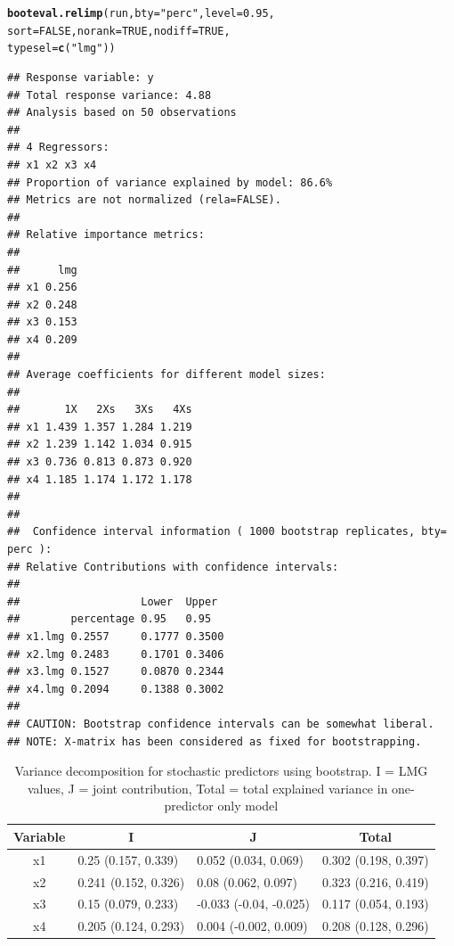 \documentclass[11pt,a4paper,twoside]{book}
\makeatletter
\newcommand{\hlnum}[1]{\textcolor[rgb]{0.686,0.059,0.569}{#1}}%
\newcommand{\hlstr}[1]{\textcolor[rgb]{0.192,0.494,0.8}{#1}}%
\newcommand{\hlstd}[1]{\textcolor[rgb]{0.345,0.345,0.345}{#1}}%
\newcommand{\hlkwc}[1]{\textcolor[rgb]{0.333,0.667,0.333}{#1}}%
\newcommand{\hlkwd}[1]{\textcolor[rgb]{0.737,0.353,0.396}{\textbf{#1}}}%
\newenvironment{kframe}{%
 \def\at@end@of@kframe{}%
 \ifinner\ifhmode%
  \def\at@end@of@kframe{\end{minipage}}%
  \begin{minipage}{\columnwidth}%
 \fi\fi%
 \def\FrameCommand##1{\hskip\@totalleftmargin \hskip-\fboxsep
 \colorbox{shadecolor}{##1}\hskip-\fboxsep
     \hskip-\linewidth \hskip-\@totalleftmargin \hskip\columnwidth}%
 \MakeFramed {\advance\hsize-\width
   \@totalleftmargin\z@ \linewidth\hsize
   \@setminipage}}%
 {\par\unskip\endMakeFramed%
 \at@end@of@kframe}
\newenvironment{knitrout}{}{} %
\makeatother
\begin{document}
\begin{knitrout}
\begin{kframe}
\begin{alltt}
\hlkwd{booteval.relimp}\hlstd{(run,} \hlkwc{bty} \hlstd{=} \hlstr{"perc"}\hlstd{,} \hlkwc{level} \hlstd{=} \hlnum{0.95}\hlstd{,}
                \hlkwc{sort} \hlstd{=} \hlnum{FALSE}\hlstd{,} \hlkwc{norank} \hlstd{=} \hlnum{TRUE}\hlstd{,} \hlkwc{nodiff} \hlstd{=} \hlnum{TRUE}\hlstd{,}
                \hlkwc{typesel} \hlstd{=} \hlkwd{c}\hlstd{(}\hlstr{"lmg"}\hlstd{))}
\end{alltt}
\begin{verbatim}
## Response variable: y 
## Total response variance: 4.88 
## Analysis based on 50 observations 
## 
## 4 Regressors: 
## x1 x2 x3 x4 
## Proportion of variance explained by model: 86.6%
## Metrics are not normalized (rela=FALSE). 
## 
## Relative importance metrics: 
## 
##      lmg
## x1 0.256
## x2 0.248
## x3 0.153
## x4 0.209
## 
## Average coefficients for different model sizes: 
## 
##       1X   2Xs   3Xs   4Xs
## x1 1.439 1.357 1.284 1.219
## x2 1.239 1.142 1.034 0.915
## x3 0.736 0.813 0.873 0.920
## x4 1.185 1.174 1.172 1.178
## 
##  
##  Confidence interval information ( 1000 bootstrap replicates, bty= perc ): 
## Relative Contributions with confidence intervals: 
##  
##                   Lower  Upper
##        percentage 0.95   0.95  
## x1.lmg 0.2557     0.1777 0.3500
## x2.lmg 0.2483     0.1701 0.3406
## x3.lmg 0.1527     0.0870 0.2344
## x4.lmg 0.2094     0.1388 0.3002
## 
## CAUTION: Bootstrap confidence intervals can be somewhat liberal. 
## NOTE: X-matrix has been considered as fixed for bootstrapping.
\end{verbatim}
\end{kframe}
\end{knitrout}

\begin{table}[h]
\centering
\begin{tabular}{clll}
  \hline
  \multicolumn{1}{c}{\textbf{Variable}} & \multicolumn{1}{c}{\textbf{I}} &\multicolumn{1}{c}{\textbf{J}} & \multicolumn{1}{c}{\textbf{Total}} \\
  \hline
x1 & 0.25 (0.157, 0.339)  & 0.052 (0.034, 0.069)   & 0.302 (0.198, 0.397)  \\ 
x2 & 0.241 (0.152, 0.326)  & 0.08 (0.062, 0.097)   & 0.323 (0.216, 0.419)  \\ 
x3 & 0.15 (0.079, 0.233)  & -0.033 (-0.04, -0.025)   & 0.117 (0.054, 0.193)  \\ 
x4 & 0.205 (0.124, 0.293)  & 0.004 (-0.002, 0.009)   & 0.208 (0.128, 0.296)  \\ 

   \hline
\end{tabular}
\caption{Variance decomposition for stochastic predictors using bootstrap. I = LMG values, J = joint contribution, Total = total explained variance in one-predictor only model}
\label{tbl:nonstochEx1}
\end{table}
\end{document}
